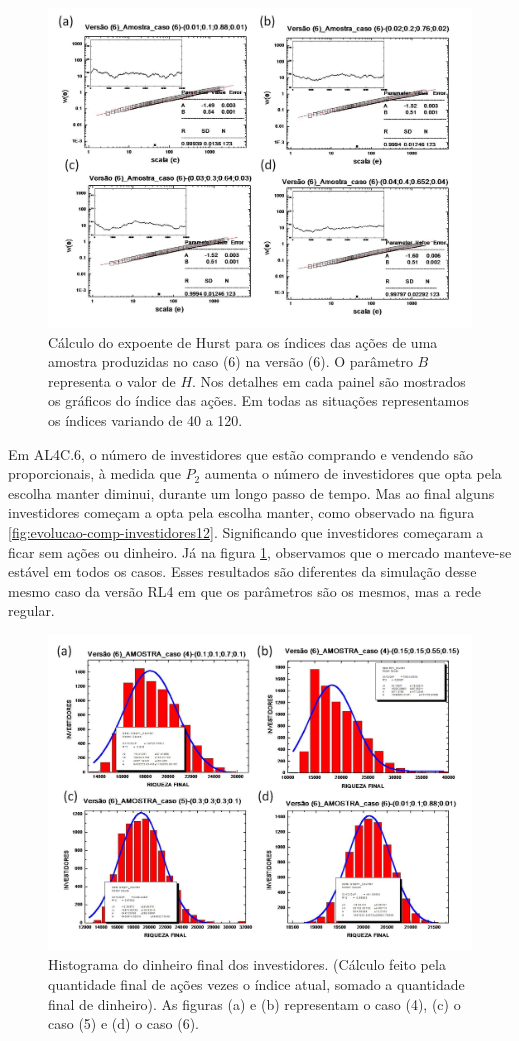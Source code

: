 \documentclass[brazil,ruledheader]{abnt}
\begin{document}
\begin{figure}[!h]
\centering
\includegraphics[width=.7\linewidth]{Figuras/42.jpg}
\caption{Cálculo do expoente de Hurst para os índices das ações de uma amostra
produzidas no caso (6) na  versão (6).  O parâmetro $B$ representa o valor de
$H$. Nos detalhes em cada painel são mostrados os gráficos do índice das ações.
Em todas as situações representamos os índices variando de 40 a 120. }
\label{fig:calculo-exp-hurst15}
\end{figure}

Em AL4C.6, o número de investidores que estão comprando e
vendendo são proporcionais, à medida que $P_2$ aumenta o número de investidores
que opta pela escolha manter diminui, durante um longo passo de tempo. Mas ao
final alguns investidores começam a opta pela escolha manter, como observado na
figura \ref{fig:evolucao-comp-investidores12}. Significando que investidores
começaram a ficar sem ações ou dinheiro. Já na figura
\ref{fig:calculo-exp-hurst15}, observamos que o mercado manteve-se estável em
todos os casos. Esses resultados
são diferentes da simulação desse mesmo caso da versão RL4 em que os parâmetros
são os mesmos, mas a rede regular.

\begin{figure}[!h]
\centering
\includegraphics[width=.7\linewidth]{Figuras/43.jpg}
\caption{Histograma do dinheiro final dos investidores. (Cálculo feito pela
quantidade final de ações vezes o índice atual, somado a quantidade final de
dinheiro). As figuras (a) e (b) representam o caso (4), (c)  o caso (5) e (d) o
caso (6).}
\label{fig:histograma4}
\end{figure}
\end{document}
